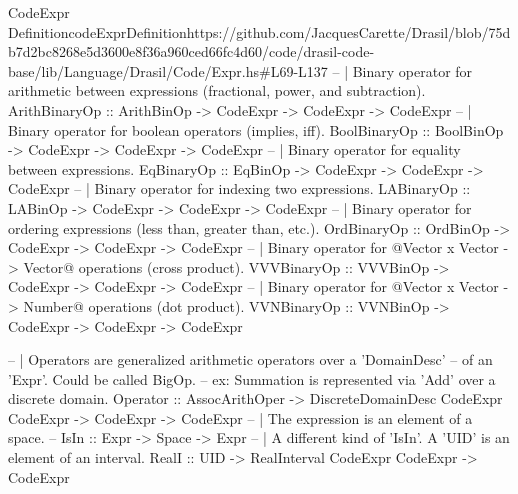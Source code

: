 \begin{haskell}{CodeExpr Definition}{codeExprDefinition}{https://github.com/JacquesCarette/Drasil/blob/75db7d2bc8268e5d3600e8f36a960ced66fc4d60/code/drasil-code-base/lib/Language/Drasil/Code/Expr.hs\#L69-L137}
  -- | Binary operator for arithmetic between expressions (fractional, power, and subtraction).
  ArithBinaryOp :: ArithBinOp -> CodeExpr -> CodeExpr -> CodeExpr
  -- | Binary operator for boolean operators (implies, iff).
  BoolBinaryOp  :: BoolBinOp -> CodeExpr -> CodeExpr -> CodeExpr
  -- | Binary operator for equality between expressions.
  EqBinaryOp    :: EqBinOp -> CodeExpr -> CodeExpr -> CodeExpr
  -- | Binary operator for indexing two expressions.
  LABinaryOp    :: LABinOp -> CodeExpr -> CodeExpr -> CodeExpr
  -- | Binary operator for ordering expressions (less than, greater than, etc.).
  OrdBinaryOp   :: OrdBinOp -> CodeExpr -> CodeExpr -> CodeExpr
  -- | Binary operator for @Vector x Vector -> Vector@ operations (cross product).
  VVVBinaryOp   :: VVVBinOp -> CodeExpr -> CodeExpr -> CodeExpr
  -- | Binary operator for @Vector x Vector -> Number@ operations (dot product).
  VVNBinaryOp   :: VVNBinOp -> CodeExpr -> CodeExpr -> CodeExpr


  -- | Operators are generalized arithmetic operators over a 'DomainDesc'
  --   of an 'Expr'.  Could be called BigOp.
  --   ex: Summation is represented via 'Add' over a discrete domain.
  Operator :: AssocArithOper -> DiscreteDomainDesc CodeExpr CodeExpr -> CodeExpr -> CodeExpr
  -- | The expression is an element of a space.
  -- IsIn     :: Expr -> Space -> Expr
  -- | A different kind of 'IsIn'. A 'UID' is an element of an interval.
  RealI    :: UID -> RealInterval CodeExpr CodeExpr -> CodeExpr
\end{haskell}
